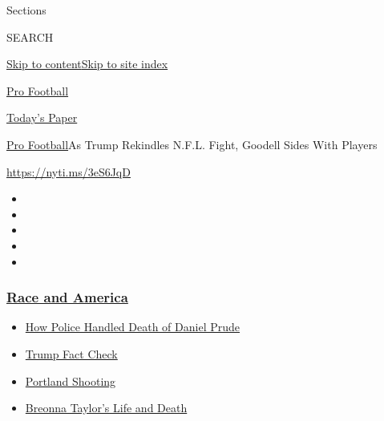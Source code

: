 Sections

SEARCH

\protect\hyperlink{site-content}{Skip to
content}\protect\hyperlink{site-index}{Skip to site index}

\href{https://www.nytimes3xbfgragh.onion/section/sports/football}{Pro
Football}

\href{https://myaccount.nytimes3xbfgragh.onion/auth/login?response_type=cookie\&client_id=vi}{}

\href{https://www.nytimes3xbfgragh.onion/section/todayspaper}{Today's
Paper}

\href{/section/sports/football}{Pro Football}\textbar{}As Trump
Rekindles N.F.L. Fight, Goodell Sides With Players

\url{https://nyti.ms/3eS6JqD}

\begin{itemize}
\item
\item
\item
\item
\item
\end{itemize}

\hypertarget{race-and-america}{%
\subsubsection{\texorpdfstring{\href{https://www.nytimes3xbfgragh.onion/news-event/george-floyd-protests-minneapolis-new-york-los-angeles?name=styln-george-floyd\&region=TOP_BANNER\&block=storyline_menu_recirc\&action=click\&pgtype=Article\&impression_id=8c8f6a60-f1c2-11ea-86ae-c7e0aefa31f3\&variant=undefined}{Race
and America}}{Race and America}}\label{race-and-america}}

\begin{itemize}
\tightlist
\item
  \href{https://www.nytimes3xbfgragh.onion/2020/09/04/nyregion/rochester-police-daniel-prude.html?name=styln-george-floyd\&region=TOP_BANNER\&block=storyline_menu_recirc\&action=click\&pgtype=Article\&impression_id=8c8f6a61-f1c2-11ea-86ae-c7e0aefa31f3\&variant=undefined}{How
  Police Handled Death of Daniel Prude}
\item
  \href{https://www.nytimes3xbfgragh.onion/2020/09/01/us/politics/trump-fact-check-protests.html?name=styln-george-floyd\&region=TOP_BANNER\&block=storyline_menu_recirc\&action=click\&pgtype=Article\&impression_id=8c8f6a62-f1c2-11ea-86ae-c7e0aefa31f3\&variant=undefined}{Trump
  Fact Check}
\item
  \href{https://www.nytimes3xbfgragh.onion/2020/08/30/us/portland-shooting-explained.html?name=styln-george-floyd\&region=TOP_BANNER\&block=storyline_menu_recirc\&action=click\&pgtype=Article\&impression_id=8c8f6a63-f1c2-11ea-86ae-c7e0aefa31f3\&variant=undefined}{Portland
  Shooting}
\item
  \href{https://www.nytimes3xbfgragh.onion/2020/08/30/us/breonna-taylor-police-killing.html?name=styln-george-floyd\&region=TOP_BANNER\&block=storyline_menu_recirc\&action=click\&pgtype=Article\&impression_id=8c8f6a64-f1c2-11ea-86ae-c7e0aefa31f3\&variant=undefined}{Breonna
  Taylor's Life and Death}
\end{itemize}

